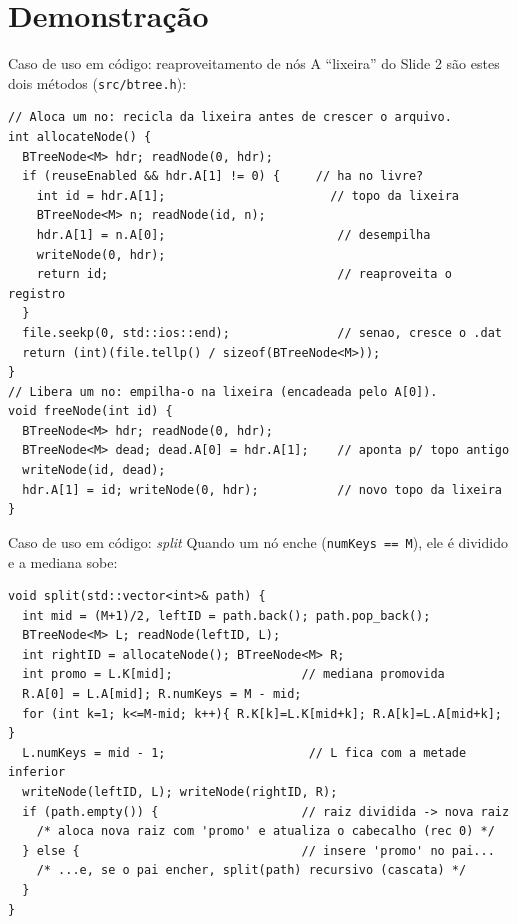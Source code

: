 \documentclass[aspectratio=169,11pt]{beamer}
\begin{document}
\section{Demonstração}

\begin{frame}[fragile]{Caso de uso em código: reaproveitamento de nós}
  A ``lixeira'' do Slide 2 são estes dois métodos (\texttt{src/btree.h}):
  \begin{lstlisting}[basicstyle=\ttfamily\fontsize{7.6}{8.4}\selectfont]
// Aloca um no: recicla da lixeira antes de crescer o arquivo.
int allocateNode() {
  BTreeNode<M> hdr; readNode(0, hdr);
  if (reuseEnabled && hdr.A[1] != 0) {     // ha no livre?
    int id = hdr.A[1];                       // topo da lixeira
    BTreeNode<M> n; readNode(id, n);
    hdr.A[1] = n.A[0];                        // desempilha
    writeNode(0, hdr);
    return id;                                // reaproveita o registro
  }
  file.seekp(0, std::ios::end);               // senao, cresce o .dat
  return (int)(file.tellp() / sizeof(BTreeNode<M>));
}
// Libera um no: empilha-o na lixeira (encadeada pelo A[0]).
void freeNode(int id) {
  BTreeNode<M> hdr; readNode(0, hdr);
  BTreeNode<M> dead; dead.A[0] = hdr.A[1];    // aponta p/ topo antigo
  writeNode(id, dead);
  hdr.A[1] = id; writeNode(0, hdr);           // novo topo da lixeira
}
  \end{lstlisting}
\end{frame}

\begin{frame}[fragile]{Caso de uso em código: \emph{split}}
  Quando um nó enche (\texttt{numKeys == M}), ele é dividido e a mediana sobe:
  \begin{lstlisting}[basicstyle=\ttfamily\scriptsize]
void split(std::vector<int>& path) {
  int mid = (M+1)/2, leftID = path.back(); path.pop_back();
  BTreeNode<M> L; readNode(leftID, L);
  int rightID = allocateNode(); BTreeNode<M> R;
  int promo = L.K[mid];                  // mediana promovida
  R.A[0] = L.A[mid]; R.numKeys = M - mid;
  for (int k=1; k<=M-mid; k++){ R.K[k]=L.K[mid+k]; R.A[k]=L.A[mid+k]; }
  L.numKeys = mid - 1;                    // L fica com a metade inferior
  writeNode(leftID, L); writeNode(rightID, R);
  if (path.empty()) {                    // raiz dividida -> nova raiz
    /* aloca nova raiz com 'promo' e atualiza o cabecalho (rec 0) */
  } else {                               // insere 'promo' no pai...
    /* ...e, se o pai encher, split(path) recursivo (cascata) */
  }
}
  \end{lstlisting}
\end{frame}
\end{document}
